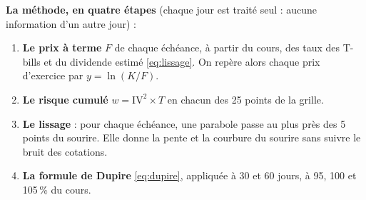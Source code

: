 \documentclass[10pt,a4paper]{article}
\begin{document}
\textbf{La méthode, en quatre étapes} (chaque jour est traité seul : aucune information d'un autre jour) :
\begin{enumerate}[nosep,leftmargin=*]
  \item \textbf{Le prix à terme} $F$ de chaque échéance, à partir du cours, des taux des T-bills et du dividende estimé \eqref{eq:lissage}. On repère alors chaque prix d'exercice par $y=\ln(K/F)$.
  \item \textbf{Le risque cumulé} $w=\text{IV}^2\times T$ en chacun des 25 points de la grille.
  \item \textbf{Le lissage} : pour chaque échéance, une parabole passe au plus près des 5 points du sourire. Elle donne la pente et la courbure du sourire sans suivre le bruit des cotations.
  \item \textbf{La formule de Dupire} \eqref{eq:dupire}, appliquée à 30 et 60 jours, à 95, 100 et 105\,\% du cours.
\end{enumerate}
\end{document}

